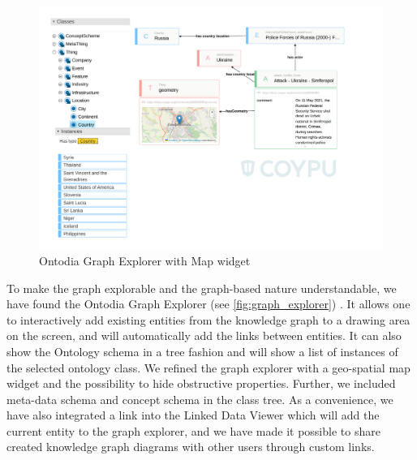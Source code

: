 \documentclass[
hf
]{ceurart}
\begin{document}
\begin{figure}
    \centering
    \includegraphics[width=\textwidth,trim={1cm 4cm 2cm 1cm},clip]{Graph Explorer.pdf}
    \caption{Ontodia Graph Explorer with Map widget}
    \label{fig:graph_explorer}
\end{figure}

To make the graph explorable and the graph-based nature understandable, we have found the Ontodia Graph Explorer (see \autoref{fig:graph_explorer}) \cite{mouromtsev2015simple}. It allows one to interactively add existing entities from the knowledge graph to a drawing area on the screen, and will automatically add the links between entities. It can also show the Ontology schema in a tree fashion and will show a list of instances of the selected ontology class. We refined the graph explorer with a geo-spatial map widget and the possibility to hide obstructive properties. Further, we included meta-data schema and concept schema in the class tree. As a convenience, we have also integrated a link into the Linked Data Viewer which will add the current entity to the graph explorer, and we have made it possible to share created knowledge graph diagrams with other users through custom links. 

\end{document}
